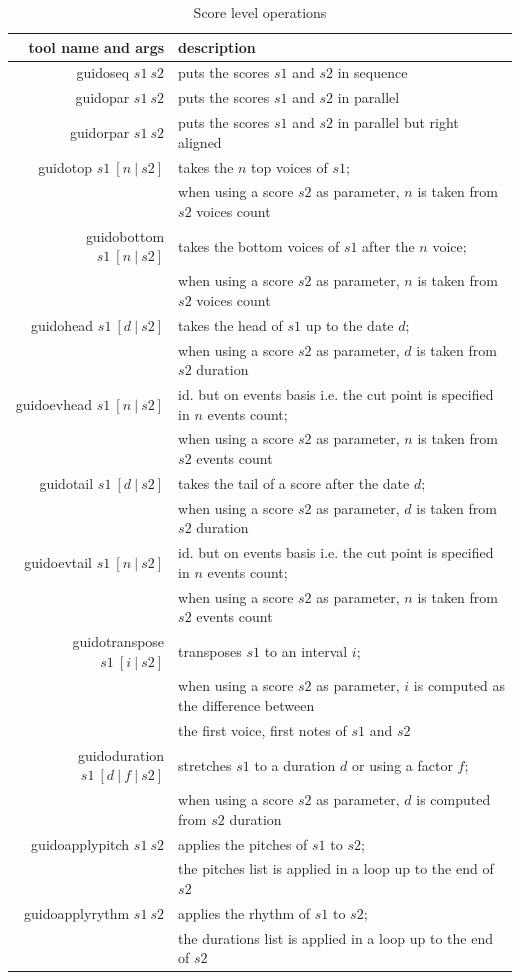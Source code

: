 \documentclass{article}
\begin{document}
\begin{table}[htdp]
\caption{Score level operations}
\begin{center}
\begin{tabular}{rl}
tool name and args		&	description \\
\hline
guidoseq $s1\ s2$		& puts the scores $s1$ and $s2$ in sequence \\
guidopar $s1\ s2$		& puts the scores $s1$ and $s2$ in parallel \\ 
guidorpar $s1\ s2$		& puts the scores $s1$ and $s2$ in parallel but right aligned \\
guidotop $s1\ [n\ | \ s2]$ 	& takes the $n$ top voices of $s1$; \\
					& when using a score $s2$ as parameter, $n$ is taken from $s2$ voices count \\
guidobottom $s1\ [n\ | \ s2]$ 	& takes the bottom voices of $s1$ after the $n$ voice;  \\
					& when using a score $s2$ as parameter, $n$ is taken from $s2$ voices count \\
guidohead	$s1\ [d\ | \ s2]$	& takes the head of $s1$ up to the date $d$; \\
				& when using a score $s2$ as parameter, $d$ is taken from $s2$ duration \\
guidoevhead $s1\ [n\ | \ s2]$	& id. but on events basis i.e. the cut point is specified in $n$ events count; \\
				& when using a score $s2$ as parameter, $n$ is taken from $s2$ events count \\
guidotail	$s1\ [d\ | \ s2]$ 	& takes the tail of a score after the date $d$; \\
				& when using a score $s2$ as parameter, $d$ is taken from $s2$ duration \\
guidoevtail $s1\ [n\ | \ s2]$ 	& id. but on events basis i.e. the cut point is specified in $n$ events count; \\
				& when using a score $s2$ as parameter, $n$ is taken from $s2$ events count \\
guidotranspose $s1\ [i\ | \ s2]$	& transposes $s1$ to an interval $i$; \\
				& when using a score $s2$ as parameter, $i$ is computed as the difference between \\
				& the first voice, first notes of $s1$ and $s2$ \\
guidoduration $s1\ [d\ |\ f\ |\ s2]$	& stretches $s1$ to a duration $d$ or using a factor $f$; \\
				& when using a score $s2$ as parameter, $d$ is computed from $s2$ duration \\
guidoapplypitch $s1\ s2$	& applies the pitches of $s1$ to $s2$; \\
				& the pitches list is applied in a loop up to the end of $s2$ \\
guidoapplyrythm $s1\ s2$	& applies the rhythm of $s1$ to $s2$; \\
				& the durations list is applied in a loop up to the end of $s2$ \\
\hline
\end{tabular}
\end{center}
\label{operations}
\end{table}
\end{document}
